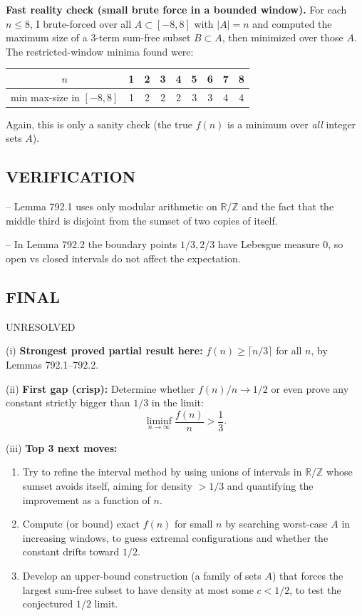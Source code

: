 \medskip
\textbf{Fast reality check (small brute force in a bounded window).}
For each $n\le 8$, I brute-forced over all $A\subset[-8,8]$ with $|A|=n$ and computed the maximum size of a 3-term sum-free subset $B\subset A$, then minimized over those $A$.
The restricted-window minima found were:
\begin{center}
\begin{tabular}{c|cccccccc}
$n$ & 1 & 2 & 3 & 4 & 5 & 6 & 7 & 8\\\hline
min max-size in $[-8,8]$ & 1 & 2 & 2 & 2 & 3 & 3 & 4 & 4
\end{tabular}
\end{center}
Again, this is only a sanity check (the true $f(n)$ is a minimum over \emph{all} integer sets $A$).

\subsection*{VERIFICATION}
-- Lemma 792.1 uses only modular arithmetic on $\mathbb R/\mathbb Z$ and the fact that the middle third is disjoint from the sumset of two copies of itself.

-- In Lemma 792.2 the boundary points $1/3,2/3$ have Lebesgue measure $0$, so open vs closed intervals do not affect the expectation.

\subsection*{FINAL}
UNRESOLVED

(i) \textbf{Strongest proved partial result here:} $f(n)\ge \lceil n/3\rceil$ for all $n$, by Lemmas 792.1--792.2.

(ii) \textbf{First gap (crisp):} Determine whether $f(n)/n\to 1/2$ or even prove any constant strictly bigger than $1/3$ in the limit:
\[\liminf_{n\to\infty} \frac{f(n)}{n} > \frac13.
\]

(iii) \textbf{Top 3 next moves:}
\begin{enumerate}
\item Try to refine the interval method by using unions of intervals in $\mathbb R/\mathbb Z$ whose sumset avoids itself, aiming for density $>1/3$ and quantifying the improvement as a function of $n$.
\item Compute (or bound) exact $f(n)$ for small $n$ by searching worst-case $A$ in increasing windows, to guess extremal configurations and whether the constant drifts toward $1/2$.
\item Develop an upper-bound construction (a family of sets $A$) that forces the largest sum-free subset to have density at most some $c<1/2$, to test the conjectured $1/2$ limit.
\end{enumerate}

